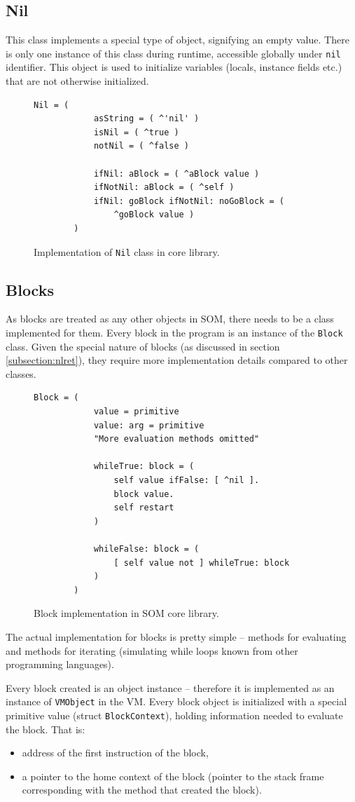 \documentclass[thesis=M,english]{FITthesis}[2019/12/23]
\begin{document}
\subsection{Nil}
This class implements a special type of object, signifying an empty value. There is only one instance of this class during runtime,
accessible globally under \texttt{nil} identifier. This object is used to initialize variables (locals, instance fields etc.) that
are not otherwise initialized.
\begin{figure}
	\centering
	\begin{lstlisting}[language=Smalltalk]
		Nil = (
			asString = ( ^'nil' )
			isNil = ( ^true )
    		notNil = ( ^false )

    		ifNil: aBlock = ( ^aBlock value )
    		ifNotNil: aBlock = ( ^self )
    		ifNil: goBlock ifNotNil: noGoBlock = ( 
				^goBlock value )
		)
	\end{lstlisting}
	\caption{Implementation of \texttt{Nil} class in core library.}
	\label{fig:nil_impl}
\end{figure}

\subsection{Blocks}
As blocks are treated as any other objects in SOM, there needs to be a class implemented for them. Every block in the program is 
an instance of the \texttt{Block} class. Given the special nature of blocks (as discussed in section \ref{subsection:nlret}), they
require more implementation details compared to other classes.

\begin{figure}[h!]
	\centering
	\begin{lstlisting}[language=Smalltalk]
		Block = (
			value = primitive
			value: arg = primitive
			"More evaluation methods omitted"
			
			whileTrue: block = (
				self value ifFalse: [ ^nil ].
				block value.
				self restart
			)

			whileFalse: block = (
				[ self value not ] whileTrue: block
			)
		)
	\end{lstlisting}
	\caption{Block implementation in SOM core library.}
\end{figure}

The actual implementation for blocks is pretty simple -- methods for evaluating and methods for iterating (simulating while loops known from
other programming languages).

Every block created is an object instance -- therefore it is implemented as an instance of \texttt{VMObject} in the VM. Every block object is
initialized with a special primitive value (struct \texttt{BlockContext}), holding information needed to evaluate the block. That is:
\begin{itemize}
	\item address of the first instruction of the block,
	\item a pointer to the home context of the block (pointer to the stack frame corresponding with the method that created the block).
\end{itemize}
\end{document}

